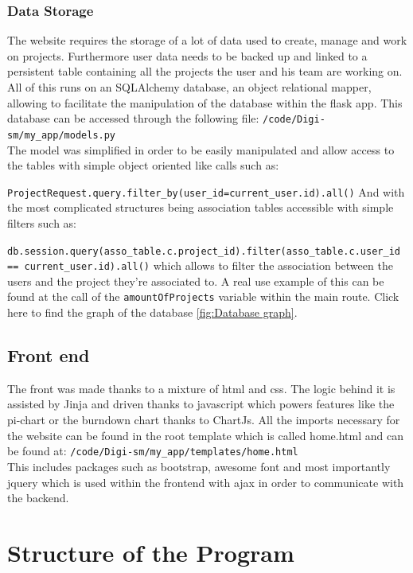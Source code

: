 \documentclass{article}
\begin{document}
\subsubsection{Data Storage}
The website requires the storage of a lot of data used to create, manage and work on projects. Furthermore user data needs to be backed up and linked to a persistent table containing all the projects the user and his team are working on. All of this runs on an SQLAlchemy database, an object relational mapper, allowing to facilitate the manipulation of the database within the flask app. This database can be accessed through the following file:\newline
\verb|/code/Digi-sm/my_app/models.py| \\
The model was simplified in order to be easily manipulated and allow access to the tables with simple object oriented like calls such as:

\verb|ProjectRequest.query.filter_by(user_id=current_user.id).all()|
And with the most complicated structures being association tables accessible with simple filters such as:

\verb|db.session.query(asso_table.c.project_id).filter(asso_table.c.user_id == current_user.id).all()|
which allows to filter the association between the users and the project they're associated to.
A real use example of this can be found at the call of the \verb|amountOfProjects| variable within the main route.
Click here to find the graph of the database \ref{fig:Database graph}. 


\subsection{Front end}

The front was made thanks to a mixture of html and css. The logic behind it is assisted by Jinja and driven thanks to javascript which powers features like the pi-chart or the burndown chart thanks to ChartJs.
All the imports necessary for the website can be found in the root template which is called home.html and can be found at:
\verb|/code/Digi-sm/my_app/templates/home.html|\\
This includes packages such as bootstrap, awesome font and most importantly jquery which is used within the frontend with ajax in order to communicate with the backend.


\section{Structure of the Program}
\end{document}
